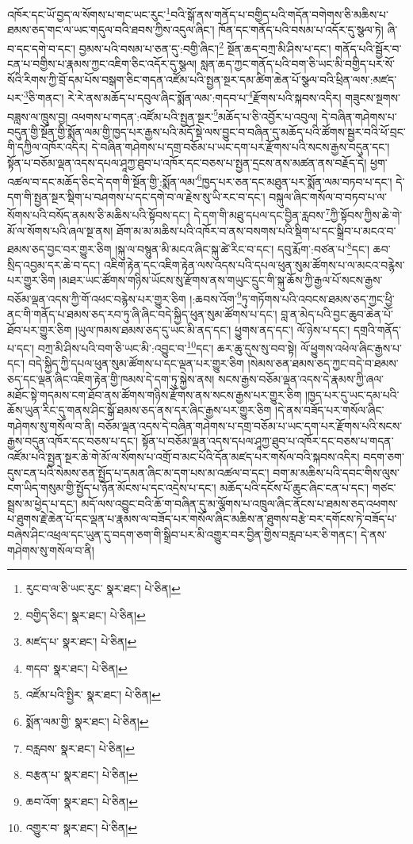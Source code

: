 འཁོར་དང་ཡོ་བྱད་ལ་སོགས་པ་གང་ཡང་རུང་\footnote{རུང་བ་ལ་ཅི་ཡང་རུང་  སྣར་ཐང་།  པེ་ཅིན། }བའི་སྒོ་ནས་གནོད་པ་བགྱིད་པའི་གདོན་བགེགས་ཅི་མཆིས་པ་ཐམས་ཅད་གང་ལ་ཡང་གདུལ་བའི་ཐབས་ཀྱིས་འདུལ་ཞིང་། ཁོན་དང་གནོད་པའི་བསམ་པ་འདོར་དུ་སྩལ་ཏེ། ཞི་བ་དང་དགེ་བ་དང་། བྱམས་པའི་བསམ་པ་ཅན་དུ་:བགྱི་ཞིང་།\footnote{བགྱིད་ཅིང་།  སྣར་ཐང་།  པེ་ཅིན། } སྔོན་ཆད་བཀྲ་མི་ཤིས་པ་དང་། གནོད་པའི་སྦྱོར་བ་ངན་པ་བགྱིས་པ་རྣམས་ཀྱང་འཇིག་ཅིང་འདོར་དུ་སྩལ། སླན་ཆད་ཀྱང་གནོད་པའི་བག་ཅི་ཡང་མི་བགྱིད་པར་སོ་སོའི་རིགས་ཀྱི་བྲོ་དམ་པོས་བསྒག་ཅིང་གདན་འཛོམ་པའི་སྤྱན་སྔར་དམ་ཚིག་ཆེན་པོ་སྩལ་བའི་ཕྲིན་ལས་:མཛད་པར་\footnote{མཛད་པ་  སྣར་ཐང་།  པེ་ཅིན། }ཅི་གནང་། རེ་རེ་ནས་མཆོད་པ་དབུལ་ཞིང་སྨོན་ལམ་:གདབ་པ་\footnote{གདབ་  སྣར་ཐང་།  པེ་ཅིན། }རྫོགས་པའི་སྐབས་འདིར། གཟུངས་སྔགས་བཟླས་ལ་ཁྲུས་བྱ། འཕགས་པ་གདན་:འཛོམ་པའི་སྤྱན་སྔར་\footnote{འཛོམ་པའི་སྤྱིར་  སྣར་ཐང་།  པེ་ཅིན། }མཆོད་པ་ཅི་འབྱོར་པ་འབུལ། དེ་བཞིན་གཤེགས་པ་བདུན་གྱི་སྔོན་གྱི་སྨོན་ལམ་གྱི་ཁྱད་པར་རྒྱས་པའི་མདོ་སྡེ་ལས་བྱུང་བ་བཞིན་དུ་མཆོད་པའི་ཚོགས་སྦྱར་བའི་ཕོ་བྲང་གི་དཀྱིལ་འཁོར་འདིར། དེ་བཞིན་གཤེགས་པ་དགྲ་བཅོམ་པ་ཡང་དག་པར་རྫོགས་པའི་སངས་རྒྱས་བདུན་དང་། སྟོན་པ་བཅོམ་ལྡན་འདས་དཔལ་ཤཱཀྱ་ཐུབ་པ་འཁོར་དང་བཅས་པ་སྤྱན་དྲངས་ནས་མཚན་ནས་བརྗོད་དེ། ཕྱག་འཚལ་བ་དང་མཆོད་ཅིང་དེ་དག་གི་སྔོན་གྱི་:སྨོན་ལམ་\footnote{སྨོན་ལམ་གྱི་  སྣར་ཐང་།  པེ་ཅིན། }ཁྱད་པར་ཅན་དང་མཐུན་པར་སྨོན་ལམ་བཏབ་པ་དང་། དེ་དག་གི་སྤྱན་སྔར་སྡིག་པ་བཤགས་པ་དང་དགེ་བ་ལ་རྗེས་སུ་ཡི་རང་བ་དང་། བསྐུལ་ཞིང་གསོལ་བ་བཏབ་པ་ལ་སོགས་པའི་བསོད་ནམས་ཅི་མཆིས་པའི་སྟོབས་དང་། དེ་དག་གི་མཐུ་དཔལ་དང་བྱིན་རླབས་\footnote{བརླབས་  སྣར་ཐང་།  པེ་ཅིན། }ཀྱི་སྟོབས་ཀྱིས་ཆེ་གེ་མོ་ལ་སོགས་པའི་ཞལ་སྔ་ནས། ཐོག་མ་མ་མཆིས་པའི་འཁོར་བ་ནས་བསགས་པའི་སྡིག་པ་དང་སྒྲིབ་པ་མངའ་བ་ཐམས་ཅད་བྱང་བར་གྱུར་ཅིག །སྐུ་ལ་བསྙུན་མི་མངའ་ཞིང་སྐུ་ཚེ་རིང་བ་དང་། དབུ་རྨོག་:བཙན་པ་\footnote{བརྩན་པ་  སྣར་ཐང་།  པེ་ཅིན། }དང་། ཆབ་སྲིད་འབྱམ་དར་ཆེ་བ་དང་། འཇིག་རྟེན་དང་འཇིག་རྟེན་ལས་འདས་པའི་དཔལ་ཕུན་སུམ་ཚོགས་པ་ལ་མངའ་བརྙེས་པར་གྱུར་ཅིག །མཐར་ཡང་ཚོགས་གཉིས་ཡོངས་སུ་རྫོགས་ནས་གཡུང་དྲུང་གི་སྐུ་ཆོས་ཀྱི་རྒྱལ་པོ་སངས་རྒྱས་བཅོམ་ལྡན་འདས་ཀྱི་གོ་འཕང་བརྙེས་པར་གྱུར་ཅིག །:ཆབས་འོག་\footnote{ཆབ་འོག་  སྣར་ཐང་།  པེ་ཅིན། }ཏུ་གཏོགས་པའི་འབངས་ཐམས་ཅད་ཀྱང་ཕྱི་ནང་གི་གནོད་པ་ཐམས་ཅད་རབ་ཏུ་ཞི་ཞིང་བདེ་སྐྱིད་ཕུན་སུམ་ཚོགས་པ་དང་། བླ་ན་མེད་པའི་བྱང་ཆུབ་ཆེན་པོ་ཐོབ་པར་གྱུར་ཅིག །ཡུལ་ཁམས་ཐམས་ཅད་དུ་ཡང་མི་ནད་དང་། ཕྱུགས་ནད་དང་། ལོ་ཉེས་པ་དང་། དགྲའི་གནོད་པ་དང་། བཀྲ་མི་ཤིས་པའི་བག་ཅི་ཡང་མི་:འབྱུང་བ་\footnote{འགྱུར་བ་  སྣར་ཐང་།  པེ་ཅིན། }དང་། ཆར་ཆུ་དུས་སུ་བབ་སྟེ། ལོ་ཕྱུགས་འཕེལ་ཞིང་རྒྱས་པ་དང་། བདེ་སྐྱིད་ཀྱི་དཔལ་ཕུན་སུམ་ཚོགས་པ་དང་ལྡན་པར་གྱུར་ཅིག །སེམས་ཅན་ཐམས་ཅད་ཀྱང་བདེ་བ་ཐམས་ཅད་དང་ལྡན་ཞིང་འཇིག་རྟེན་གྱི་ཁམས་དེ་དག་ཏུ་སྐྱེས་ནས། སངས་རྒྱས་བཅོམ་ལྡན་འདས་དེ་རྣམས་ཀྱི་ཞལ་མཐོང་སྟེ་གདམས་ངག་ཐོབ་ནས་ཚོགས་གཉིས་རྫོགས་ནས་སངས་རྒྱས་པར་གྱུར་ཅིག །ཁྱད་པར་དུ་ཡང་དམ་པའི་ཆོས་ཡུན་རིང་དུ་གནས་ཤིང་སྒོ་ཐམས་ཅད་ནས་དར་ཞིང་རྒྱས་པར་གྱུར་ཅིག །དེ་ནས་བཟོད་པར་གསོལ་ཞིང་གཤེགས་སུ་གསོལ་བ་ནི། བཅོམ་ལྡན་འདས་དེ་བཞིན་གཤེགས་པ་དགྲ་བཅོམ་པ་ཡང་དག་པར་རྫོགས་པའི་སངས་རྒྱས་བདུན་འཁོར་དང་བཅས་པ་དང་། སྟོན་པ་བཅོམ་ལྡན་འདས་དཔལ་ཤཱཀྱ་ཐུབ་པ་འཁོར་དང་བཅས་པ་གདན་འཛོམ་པའི་སྤྱན་སྔར་ཆེ་གེ་མོ་ལ་སོགས་པ་འགྲོ་བ་མང་པོའི་དོན་མཛད་པར་གསོལ་བའི་སྐབས་འདིར། བདག་ཅག་དུས་ངན་པའི་སེམས་ཅན་སྤྱོད་པ་དམན་ཞིང་མ་དག་པས་མ་འཚལ་བ་དང་། བག་མ་མཆིས་པའི་དབང་གིས་ལུས་ངག་ཡིད་གསུམ་གྱི་སྤྱོད་པ་ཉོན་མོངས་པ་དང་འདྲེས་པ་དང་། མཆོད་པའི་དངོས་པོ་ཆུང་ཞིང་ངན་པ་དང་། གཙང་སྦྲས་མ་ཕྱེད་པ་དང་། མདོ་ལས་འབྱུང་བའི་ཆོ་ག་བཞིན་དུ་མ་ལྕོགས་པ་འཁྲུལ་ཞིང་ནོངས་པ་ཐམས་ཅད་འཕགས་པ་ཐུགས་རྗེ་ཆེན་པོ་དང་ལྡན་པ་རྣམས་ལ་བཟོད་པར་གསོལ་ཞིང་མཆིས་ན་ཐུགས་བརྩེ་བར་དགོངས་ཏེ་བཟོད་པ་བཞེས་ཤིང་འཕྲལ་དང་ཡུན་དུ་བདག་ཅག་གི་སྒྲིབ་པར་མི་འགྱུར་བར་བྱིན་གྱིས་བརླབ་པར་ཅི་གནང་། དེ་ནས་གཤེགས་སུ་གསོལ་བ་ནི། 